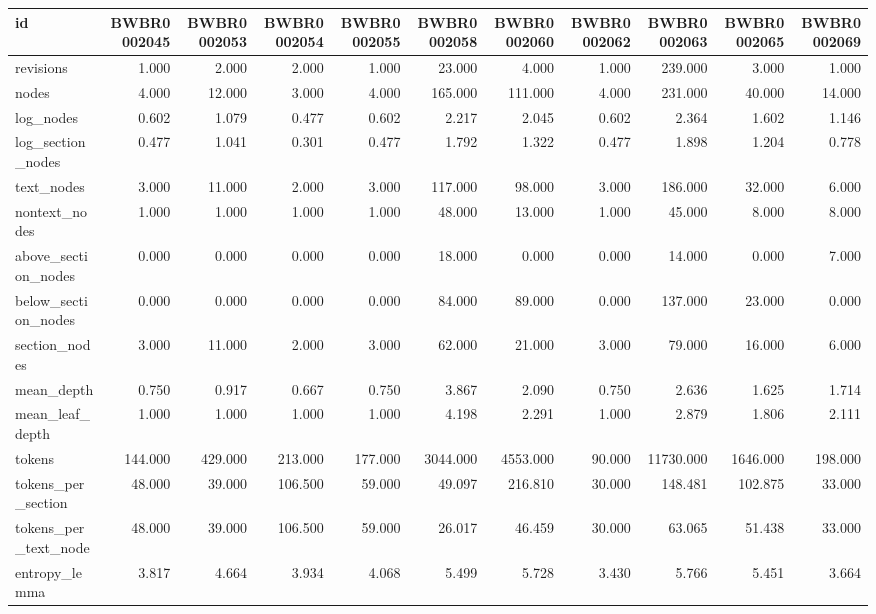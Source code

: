 \begin{tabular}{lrrrrrrrrrr}
\toprule
id & BWBR0002045 & BWBR0002053 & BWBR0002054 & BWBR0002055 & BWBR0002058 & BWBR0002060 & BWBR0002062 & BWBR0002063 & BWBR0002065 & BWBR0002069 \\
\midrule
revisions & 1.000 & 2.000 & 2.000 & 1.000 & 23.000 & 4.000 & 1.000 & 239.000 & 3.000 & 1.000 \\
\cline{1-11}
nodes & 4.000 & 12.000 & 3.000 & 4.000 & 165.000 & 111.000 & 4.000 & 231.000 & 40.000 & 14.000 \\
\cline{1-11}
log\_nodes & 0.602 & 1.079 & 0.477 & 0.602 & 2.217 & 2.045 & 0.602 & 2.364 & 1.602 & 1.146 \\
\cline{1-11}
log\_section\_nodes & 0.477 & 1.041 & 0.301 & 0.477 & 1.792 & 1.322 & 0.477 & 1.898 & 1.204 & 0.778 \\
\cline{1-11}
text\_nodes & 3.000 & 11.000 & 2.000 & 3.000 & 117.000 & 98.000 & 3.000 & 186.000 & 32.000 & 6.000 \\
\cline{1-11}
nontext\_nodes & 1.000 & 1.000 & 1.000 & 1.000 & 48.000 & 13.000 & 1.000 & 45.000 & 8.000 & 8.000 \\
\cline{1-11}
above\_section\_nodes & 0.000 & 0.000 & 0.000 & 0.000 & 18.000 & 0.000 & 0.000 & 14.000 & 0.000 & 7.000 \\
\cline{1-11}
below\_section\_nodes & 0.000 & 0.000 & 0.000 & 0.000 & 84.000 & 89.000 & 0.000 & 137.000 & 23.000 & 0.000 \\
\cline{1-11}
section\_nodes & 3.000 & 11.000 & 2.000 & 3.000 & 62.000 & 21.000 & 3.000 & 79.000 & 16.000 & 6.000 \\
\cline{1-11}
mean\_depth & 0.750 & 0.917 & 0.667 & 0.750 & 3.867 & 2.090 & 0.750 & 2.636 & 1.625 & 1.714 \\
\cline{1-11}
mean\_leaf\_depth & 1.000 & 1.000 & 1.000 & 1.000 & 4.198 & 2.291 & 1.000 & 2.879 & 1.806 & 2.111 \\
\cline{1-11}
tokens & 144.000 & 429.000 & 213.000 & 177.000 & 3044.000 & 4553.000 & 90.000 & 11730.000 & 1646.000 & 198.000 \\
\cline{1-11}
tokens\_per\_section & 48.000 & 39.000 & 106.500 & 59.000 & 49.097 & 216.810 & 30.000 & 148.481 & 102.875 & 33.000 \\
\cline{1-11}
tokens\_per\_text\_node & 48.000 & 39.000 & 106.500 & 59.000 & 26.017 & 46.459 & 30.000 & 63.065 & 51.438 & 33.000 \\
\cline{1-11}
entropy\_lemma & 3.817 & 4.664 & 3.934 & 4.068 & 5.499 & 5.728 & 3.430 & 5.766 & 5.451 & 3.664 \\

\end{tabular}
